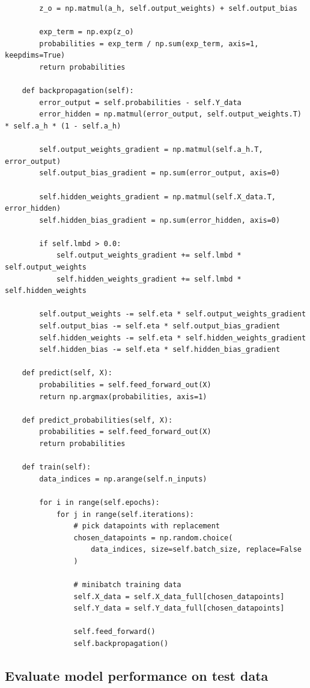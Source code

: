 \documentclass[%
oneside,                 %
final,                   %
10pt]{article}
\begin{document}
\begin{verbatim}
        z_o = np.matmul(a_h, self.output_weights) + self.output_bias
        
        exp_term = np.exp(z_o)
        probabilities = exp_term / np.sum(exp_term, axis=1, keepdims=True)
        return probabilities

    def backpropagation(self):
        error_output = self.probabilities - self.Y_data
        error_hidden = np.matmul(error_output, self.output_weights.T) * self.a_h * (1 - self.a_h)

        self.output_weights_gradient = np.matmul(self.a_h.T, error_output)
        self.output_bias_gradient = np.sum(error_output, axis=0)

        self.hidden_weights_gradient = np.matmul(self.X_data.T, error_hidden)
        self.hidden_bias_gradient = np.sum(error_hidden, axis=0)

        if self.lmbd > 0.0:
            self.output_weights_gradient += self.lmbd * self.output_weights
            self.hidden_weights_gradient += self.lmbd * self.hidden_weights

        self.output_weights -= self.eta * self.output_weights_gradient
        self.output_bias -= self.eta * self.output_bias_gradient
        self.hidden_weights -= self.eta * self.hidden_weights_gradient
        self.hidden_bias -= self.eta * self.hidden_bias_gradient

    def predict(self, X):
        probabilities = self.feed_forward_out(X)
        return np.argmax(probabilities, axis=1)

    def predict_probabilities(self, X):
        probabilities = self.feed_forward_out(X)
        return probabilities

    def train(self):
        data_indices = np.arange(self.n_inputs)

        for i in range(self.epochs):
            for j in range(self.iterations):
                # pick datapoints with replacement
                chosen_datapoints = np.random.choice(
                    data_indices, size=self.batch_size, replace=False
                )

                # minibatch training data
                self.X_data = self.X_data_full[chosen_datapoints]
                self.Y_data = self.Y_data_full[chosen_datapoints]

                self.feed_forward()
                self.backpropagation()
\end{verbatim}

\subsection*{Evaluate model performance on test data}
\end{document}
